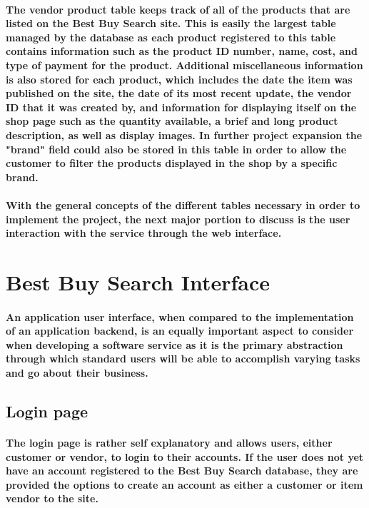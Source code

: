 \documentclass[sigconf]{acmart}
\begin{document}
\paragraph{The vendor product table keeps track of all of the products that are listed on the Best Buy Search site. This is easily the largest table managed by the database as each product registered to this table contains information such as the product ID number, name, cost, and type of payment for the product. Additional miscellaneous information is also stored for each product, which includes the date the item was published on the site, the date of its most recent update, the vendor ID that it was created by, and information for displaying itself on the shop page such as the quantity available, a brief and long product description, as well as display images. In further project expansion the "brand" field could also be stored in this table in order to allow the customer to  filter the products displayed in the shop by a specific brand.}

\paragraph{With the general concepts of the different tables necessary in order to implement the project, the next major portion to discuss is the user interaction with the service through the web interface.}

\section{Best Buy Search Interface}

\paragraph{An application user interface, when compared to the implementation of an application backend, is an equally important aspect to consider when developing a software service as it is the primary abstraction through which standard users will be able to accomplish varying tasks and go about their business.}

\subsection{Login page}

\paragraph{The login page is rather self explanatory and allows users, either customer or vendor, to login to their accounts. If the user does not yet have an account registered to the Best Buy Search database, they are provided the options to create an account as either a customer or item vendor to the site.}
\end{document}
